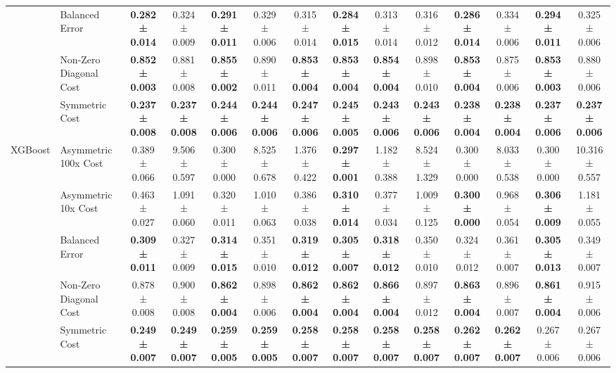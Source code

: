 \begin{table}[H]
{\begin{tabular}{llcccccccccccc}
 & Balanced Error & \textbf{0.282 ± 0.014} & 0.324 ± 0.009 & \textbf{0.291 ± 0.011} & 0.329 ± 0.006 & 0.315 ± 0.014 & \textbf{0.284 ± 0.015} & 0.313 ± 0.014 & 0.316 ± 0.012 & \textbf{0.286 ± 0.014} & 0.334 ± 0.006 & \textbf{0.294 ± 0.011} & 0.325 ± 0.006 \\
 & Non-Zero Diagonal Cost & \textbf{0.852 ± 0.003} & 0.881 ± 0.008 & \textbf{0.855 ± 0.002} & 0.890 ± 0.011 & \textbf{0.853 ± 0.004} & \textbf{0.853 ± 0.004} & \textbf{0.854 ± 0.004} & 0.898 ± 0.010 & \textbf{0.853 ± 0.004} & 0.875 ± 0.006 & \textbf{0.853 ± 0.003} & 0.880 ± 0.006 \\
 & Symmetric Cost & \textbf{0.237 ± 0.008} & \textbf{0.237 ± 0.008} & \textbf{0.244 ± 0.006} & \textbf{0.244 ± 0.006} & \textbf{0.247 ± 0.006} & \textbf{0.245 ± 0.005} & \textbf{0.243 ± 0.006} & \textbf{0.243 ± 0.006} & \textbf{0.238 ± 0.004} & \textbf{0.238 ± 0.004} & \textbf{0.237 ± 0.006} & \textbf{0.237 ± 0.006} \\
\cline{1-14}
\multirow[t]{5}{*}{XGBoost} & Asymmetric 100x Cost & 0.389 ± 0.066 & 9.506 ± 0.597 & 0.300 ± 0.000 & 8.525 ± 0.678 & 1.376 ± 0.422 & \textbf{0.297 ± 0.001} & 1.182 ± 0.388 & 8.524 ± 1.329 & 0.300 ± 0.000 & 8.033 ± 0.538 & 0.300 ± 0.000 & 10.316 ± 0.557 \\
 & Asymmetric 10x Cost & 0.463 ± 0.027 & 1.091 ± 0.060 & 0.320 ± 0.011 & 1.010 ± 0.063 & 0.386 ± 0.038 & \textbf{0.310 ± 0.014} & 0.377 ± 0.034 & 1.009 ± 0.125 & \textbf{0.300 ± 0.000} & 0.968 ± 0.054 & \textbf{0.306 ± 0.009} & 1.181 ± 0.055 \\
 & Balanced Error & \textbf{0.309 ± 0.011} & 0.327 ± 0.009 & \textbf{0.314 ± 0.015} & 0.351 ± 0.010 & \textbf{0.319 ± 0.012} & \textbf{0.305 ± 0.007} & \textbf{0.318 ± 0.012} & 0.350 ± 0.010 & 0.324 ± 0.012 & 0.361 ± 0.007 & \textbf{0.305 ± 0.013} & 0.349 ± 0.007 \\
 & Non-Zero Diagonal Cost & 0.878 ± 0.008 & 0.900 ± 0.008 & \textbf{0.862 ± 0.004} & 0.898 ± 0.006 & \textbf{0.862 ± 0.004} & \textbf{0.862 ± 0.004} & \textbf{0.866 ± 0.004} & 0.897 ± 0.012 & \textbf{0.863 ± 0.004} & 0.896 ± 0.007 & \textbf{0.861 ± 0.004} & 0.915 ± 0.006 \\
 & Symmetric Cost & \textbf{0.249 ± 0.007} & \textbf{0.249 ± 0.007} & \textbf{0.259 ± 0.005} & \textbf{0.259 ± 0.005} & \textbf{0.258 ± 0.007} & \textbf{0.258 ± 0.007} & \textbf{0.258 ± 0.007} & \textbf{0.258 ± 0.007} & \textbf{0.262 ± 0.007} & \textbf{0.262 ± 0.007} & 0.267 ± 0.006 & 0.267 ± 0.006 \\
\cline{1-14}
\bottomrule
\end{tabular}
    }
\end{table}

